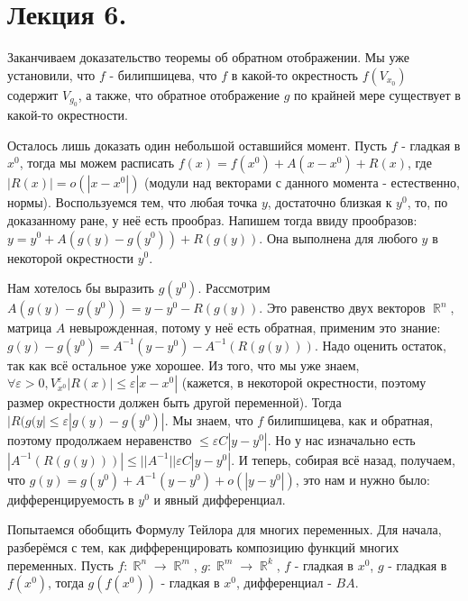\documentclass[a4paper,100pt]{article}
\theoremstyle{indented}
\theoremstyle{definition}
\theoremstyle{remark}
\DeclareMathOperator{\RR}{\mathbb{R}}
\begin{document}
\section{Лекция 6.}

Заканчиваем доказательство теоремы об обратном отображении. Мы уже установили, что $f$ - билипшицева, что $f$ в какой-то окрестность $f(V_{x_0})$ содержит $V_{g_0}$, а также, что обратное отображение $g$ по крайней мере существует в какой-то окрестности. \ 

Осталось лишь доказать один небольшой оставшийся момент. Пусть $f$ - гладкая в $x^0$, тогда мы можем расписать $f(x)=f(x^0)+A(x-x^0)+R(x)$, где $|R(x)|=o(|x-x^0|)$ (модули над векторами с данного момента - естественно, нормы). Воспользуемся тем, что любая точка $y$, достаточно близкая к $y^0$, то, по доказанному ране, у неё есть прообраз. Напишем тогда ввиду прообразов: $y=y^0+A(g(y)-g(y^0))+R(g(y))$. Она выполнена для любого $y$ в некоторой окрестности $y^0$. \ 

Нам хотелось бы выразить $g(y^0)$. Рассмотрим $A(g(y)-g(y^0))=y-y^0-R(g(y))$. Это равенство двух векторов $\RR^n$, матрица $A$ невырожденная, потому у неё есть обратная, применим это знание: $g(y)-g(y^0)=A^{-1}(y-y^0)-A^{-1}(R(g(y)))$. Надо оценить остаток, так как всё остальное уже хорошее. Из того, что мы уже знаем, $\forall \varepsilon>0, V_{x^0}^\varepsilon |R(x)|\leq \varepsilon |x-x^0|$ (кажется, в некоторой окрестности, поэтому размер окрестности должен быть другой переменной). Тогда $|R(g(y|\leq \varepsilon |g(y)-g(y^0)|$. Мы знаем, что $f$ билипшицева, как и обратная, поэтому продолжаем неравенство $\leq \varepsilon C |y-y^0|$. Но у нас изначально есть $|A^{-1}(R(g(y)))|\leq ||A^{-1}||\varepsilon C |y-y^0|$. И теперь, собирая всё назад, получаем, что $g(y)=g(y^0)+A^{-1}(y-y^0)+o(|y-y^0|)$, это нам и нужно было: дифференцируемость в $y^0$ и явный дифференциал. \ 

Попытаемся обобщить Формулу Тейлора для многих переменных. Для начала, разберёмся с тем, как дифференцировать композицию функций многих переменных. Пусть $f:\RR^n\rightarrow \RR^m$, $g:\RR^m\rightarrow \RR^k$, $f$ - гладкая в $x^0$, $g$ - гладкая в $f(x^0)$, тогда $g(f(x^0))$ - гладкая в $x^0$, дифференциал - $BA$. 
\end{document}
